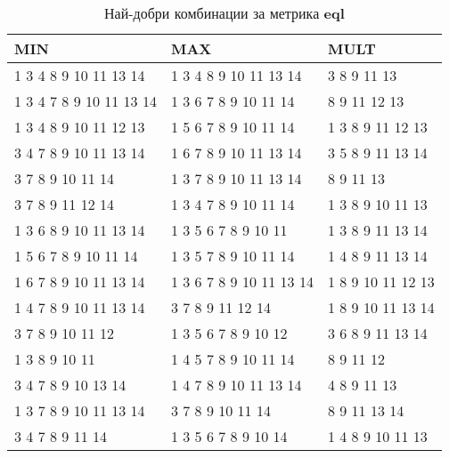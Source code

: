 \begin{table}[!htb] 
  \begin{tabular}{|l|l|l|}
\hline 
MIN &	MAX &	MULT\\ 
\hline 
1 3 4 8 9 10 11 13 14 &	1 3 4 8 9 10 11 13 14 &	3 8 9 11 13 \\ 
\hline 
1 3 4 7 8 9 10 11 13 14 &	1 3 6 7 8 9 10 11 14 &	8 9 11 12 13 \\ 
\hline 
1 3 4 8 9 10 11 12 13 &	1 5 6 7 8 9 10 11 14 &	1 3 8 9 11 12 13 \\ 
\hline 
3 4 7 8 9 10 11 13 14 &	1 6 7 8 9 10 11 13 14 &	3 5 8 9 11 13 14 \\ 
\hline 
3 7 8 9 10 11 14 &	1 3 7 8 9 10 11 13 14 &	8 9 11 13 \\ 
\hline 
3 7 8 9 11 12 14 &	1 3 4 7 8 9 10 11 14 &	1 3 8 9 10 11 13 \\ 
\hline 
1 3 6 8 9 10 11 13 14 &	1 3 5 6 7 8 9 10 11 &	1 3 8 9 11 13 14 \\ 
\hline 
1 5 6 7 8 9 10 11 14 &	1 3 5 7 8 9 10 11 14 &	1 4 8 9 11 13 14 \\ 
\hline 
1 6 7 8 9 10 11 13 14 &	1 3 6 7 8 9 10 11 13 14 &	1 8 9 10 11 12 13 \\ 
\hline 
1 4 7 8 9 10 11 13 14 &	3 7 8 9 11 12 14 &	1 8 9 10 11 13 14 \\ 
\hline 
3 7 8 9 10 11 12 &	1 3 5 6 7 8 9 10 12 &	3 6 8 9 11 13 14 \\ 
\hline 
1 3 8 9 10 11 &	1 4 5 7 8 9 10 11 14 &	8 9 11 12 \\ 
\hline 
3 4 7 8 9 10 13 14 &	1 4 7 8 9 10 11 13 14 &	4 8 9 11 13 \\ 
\hline 
1 3 7 8 9 10 11 13 14 &	3 7 8 9 10 11 14 &	8 9 11 13 14 \\ 
\hline 
3 4 7 8 9 11 14 &	1 3 5 6 7 8 9 10 14 &	1 4 8 9 10 11 13 \\ 
\hline 
 \end{tabular}
 \label{tab:lab_eql}
\caption{Най-добри комбинации за метрика \textbf{eql}}
 \end{table}

